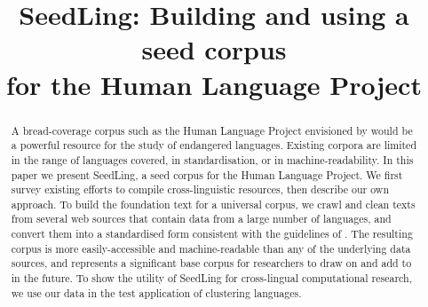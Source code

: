 \documentclass[11pt]{article}
\title{SeedLing: Building and using a seed corpus \\ for the Human Language Project}
\date{}
\newcommand{\bluenote}[1]{\textcolor{blue}{[#1]}}
\begin{document}
\maketitle
\begin{abstract}
  A bread-coverage corpus such as the Human Language Project
  envisioned by  would be a powerful
  resource for the study of endangered languages.
Existing corpora are limited in the range of languages
  covered, in standardisation, or in machine-readability. In this
  paper we present SeedLing, a seed corpus for the Human Language
  Project. We first survey existing efforts to compile
  cross-linguistic resources, then describe our own approach. To build
  the foundation text for a universal corpus, we crawl and clean
  texts from several web sources that contain data from a large number
  of languages, and convert them into a standardised form consistent
  with the guidelines of . The
  resulting corpus is more easily-accessible and machine-readable than
  any of the underlying data sources, and represents a significant
  base corpus for researchers to draw on and add to in the future. To show the utility of SeedLing for cross-lingual computational research, we use our data in the test application of clustering languages.
\end{abstract}




%



%



\end{document}
